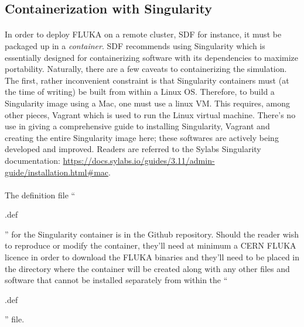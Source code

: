 \documentclass[10pt]{article}
\begin{document}
\begin{appendices}
    \section*{Containerization with Singularity}

\paragraph{}
In order to deploy FLUKA on a remote cluster, SDF for instance, it must be packaged up in a \textit{container}. SDF recommends using Singularity which is essentially designed for containerizing software with its dependencies to maximize portability. Naturally, there are a few caveats to containerizing the simulation. The first, rather inconvenient constraint is that Singularity containers must (at the time of writing) be built from within a Linux OS. Therefore, to build a Singularity image using a Mac, one must use a linux VM. This requires, among other pieces, Vagrant which is used to run the Linux virtual machine. There's no use in giving a comprehensive guide to installing Singularity, Vagrant and creating the entire Singularity image here; these softwares are actively being developed and improved. Readers are referred to the Sylabs Singularity documentation: \url{https://docs.sylabs.io/guides/3.11/admin-guide/installation.html#mac}.

\paragraph{}
The definition file ``\begin{tt}.def\end{tt}'' for the Singularity container is in the Github repository. Should the reader wish to reproduce or modify the container, they'll need at minimum a CERN FLUKA licence in order to download the FLUKA binaries and they'll need to be placed in the directory where the container will be created along with any other files and software that cannot be installed separately from within the ``\begin{tt}.def\end{tt}'' file.

\end{appendices}





% 
% 
\end{document}
